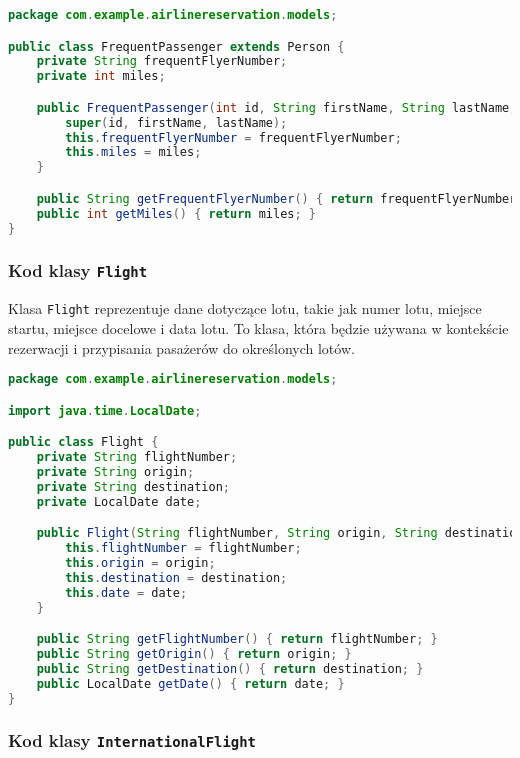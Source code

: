 \begin{lstlisting}[language=Java, caption=Klasa FrequentPassenger]
package com.example.airlinereservation.models;

public class FrequentPassenger extends Person {
    private String frequentFlyerNumber;
    private int miles;

    public FrequentPassenger(int id, String firstName, String lastName, String frequentFlyerNumber, int miles) {
        super(id, firstName, lastName);
        this.frequentFlyerNumber = frequentFlyerNumber;
        this.miles = miles;
    }

    public String getFrequentFlyerNumber() { return frequentFlyerNumber; }
    public int getMiles() { return miles; }
}
\end{lstlisting}

\subsubsection{Kod klasy \texttt{Flight}}

Klasa \texttt{Flight} reprezentuje dane dotyczące lotu, takie jak numer lotu, miejsce startu, miejsce docelowe i data lotu. To klasa, która będzie używana w kontekście rezerwacji i przypisania pasażerów do określonych lotów.

\begin{lstlisting}[language=Java, caption=Klasa Flight]
package com.example.airlinereservation.models;

import java.time.LocalDate;

public class Flight {
    private String flightNumber;
    private String origin;
    private String destination;
    private LocalDate date;

    public Flight(String flightNumber, String origin, String destination, LocalDate date) {
        this.flightNumber = flightNumber;
        this.origin = origin;
        this.destination = destination;
        this.date = date;
    }

    public String getFlightNumber() { return flightNumber; }
    public String getOrigin() { return origin; }
    public String getDestination() { return destination; }
    public LocalDate getDate() { return date; }
}
\end{lstlisting}

\subsubsection{Kod klasy \texttt{InternationalFlight}}

